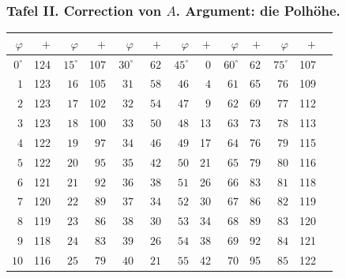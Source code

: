 \documentclass[12pt,a4paper]{article}
\theoremstyle{plain}
\theoremstyle{definition}
\theoremstyle{remark}
\begin{document}
\subsubsection*{Tafel II. Correction von $A$. Argument: die Polh\"ohe.}

\medskip
\noindent
\begin{tabular}{r|r|r|r|r|r|r|r|r|r|r|r|r}
\hline
$\varphi$ & $+$ & $\varphi$ & $+$ & $\varphi$ & $+$ & $\varphi$ & $+$ & $\varphi$ & $+$ & $\varphi$ & $+$ \\
\hline
$0^{\circ}$ & 124 & $15^{\circ}$ & 107 & $30^{\circ}$ & $\phantom{0}62$ & $45^{\circ}$ & $\phantom{0}0$ & $60^{\circ}$ & 62 & $75^{\circ}$ & 107 \\
$\phantom{0}1$ & 123 & $\phantom{0}16$ & 105 & $\phantom{0}31$ & $\phantom{0}58$ & $\phantom{0}46$ & $\phantom{0}4$ & $\phantom{0}61$ & 65 & $\phantom{0}76$ & 109 \\
$\phantom{0}2$ & 123 & $\phantom{0}17$ & 102 & $\phantom{0}32$ & $\phantom{0}54$ & $\phantom{0}47$ & $\phantom{0}9$ & $\phantom{0}62$ & 69 & $\phantom{0}77$ & 112 \\
$\phantom{0}3$ & 123 & $\phantom{0}18$ & 100 & $\phantom{0}33$ & $\phantom{0}50$ & $\phantom{0}48$ & 13 & $\phantom{0}63$ & 73 & $\phantom{0}78$ & 113 \\
$\phantom{0}4$ & 122 & $\phantom{0}19$ & $\phantom{0}97$ & $\phantom{0}34$ & $\phantom{0}46$ & $\phantom{0}49$ & 17 & $\phantom{0}64$ & 76 & $\phantom{0}79$ & 115 \\
$\phantom{0}5$ & 122 & $\phantom{0}20$ & $\phantom{0}95$ & $\phantom{0}35$ & $\phantom{0}42$ & $\phantom{0}50$ & 21 & $\phantom{0}65$ & 79 & $\phantom{0}80$ & 116 \\
$\phantom{0}6$ & 121 & $\phantom{0}21$ & $\phantom{0}92$ & $\phantom{0}36$ & $\phantom{0}38$ & $\phantom{0}51$ & 26 & $\phantom{0}66$ & 83 & $\phantom{0}81$ & 118 \\
$\phantom{0}7$ & 120 & $\phantom{0}22$ & $\phantom{0}89$ & $\phantom{0}37$ & $\phantom{0}34$ & $\phantom{0}52$ & 30 & $\phantom{0}67$ & 86 & $\phantom{0}82$ & 119 \\
$\phantom{0}8$ & 119 & $\phantom{0}23$ & $\phantom{0}86$ & $\phantom{0}38$ & $\phantom{0}30$ & $\phantom{0}53$ & 34 & $\phantom{0}68$ & 89 & $\phantom{0}83$ & 120 \\
$\phantom{0}9$ & 118 & $\phantom{0}24$ & $\phantom{0}83$ & $\phantom{0}39$ & $\phantom{0}26$ & $\phantom{0}54$ & 38 & $\phantom{0}69$ & 92 & $\phantom{0}84$ & 121 \\
$10$ & 116 & $\phantom{0}25$ & $\phantom{0}79$ & $\phantom{0}40$ & $\phantom{0}21$ & $\phantom{0}55$ & 42 & $\phantom{0}70$ & 95 & $\phantom{0}85$ & 122 \\

\end{tabular}
\end{document}
